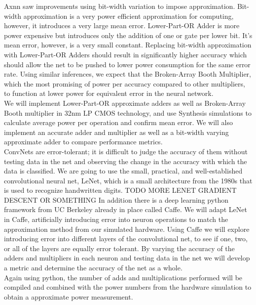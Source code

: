 \documentclass[journal]{IEEEtran}
\begin{document}
	\indent Axnn saw improvements using bit-width variation to impose approximation. Bit-width approximation is a very power efficient approximation for computing, however, it introduces a very large mean error. Lower-Part-OR Adder is more power expensive but introduces only the addition of one or gate per lower bit. It's mean error, however, is a very small constant. Replacing bit-width approximation with Lower-Part-OR Adders should result in significantly higher accuracy which should allow the net to be pushed to lower power consumption for the same error rate.
Using similar inferences, we expect that the Broken-Array Booth Multiplier, which the most promising of power per accuracy compared to other multipliers, to function at lower power for equivalent error in the neural network.\\

	\indent We will implement Lower-Part-OR approximate adders as well as Broken-Array Booth multiplier in 32nm LP CMOS technology, and use Synthesis simulations to calculate average power per operation and confirm mean error. We will also implement an accurate adder and multiplier as well as a  bit-width varying approximate adder to compare performance metrics.\\

	\indent ConvNets are error-tolerant; it is difficult to judge the accuracy of them without testing data in the net and observing the change in  the accuracy with which the data is classified. We are going to use the small, practical, and well-established convolutional neural net, LeNet, which is a small architecture from the 1980s that is used to recognize handwritten digits. TODO MORE LENET GRADIENT DESCENT OR SOMETHING In addition there is a deep learning python framework from UC Berkeley already in place called Caffe. We will adapt LeNet in Caffe, artificially introducing error into neuron operations to match the approximation method from our simulated hardware. Using Caffe we will explore introducing error into different layers of the convolutional net, to see if one, two, or all of the layers are equally error tolerant. By varying the accuracy of the adders and multipliers in each neuron and testing data in the net we will develop a metric and determine the accuracy of the net as a whole.\\

	\indent Again using python, the number of adds and multiplications performed will be compiled and combined with the power numbers from the hardware simulation to obtain a approximate power measurement. \\
\end{document}
